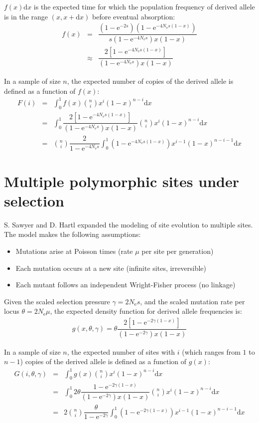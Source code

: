 \documentclass{article}
\newcommand{\e}{\mathrm{e}}
\newcommand{\der}{\mathrm{d}}
\newcommand{\Ne}{N_\mathrm{e}}
\begin{document}
$f(x) \der x $ is the expected time for which the population frequency of derived allele is in the range $(x, x+\der x)$ before eventual absorption:
\begin{eqnarray*}
	f(x) & =  & \dfrac{\left( 1 - \e^{- 2 s }\right) \left( 1 - \e^{-4 \Ne s(1-x)}\right)}{ s (1 - \e^{-4 \Ne s})x(1-x)} \\
	 & \approx  & \dfrac{2 \left[ 1 - \e^{-4 \Ne s(1-x)}\right]}{(1 - \e^{-4 \Ne s})x(1-x)}
\end{eqnarray*}

In a sample of size $n$, the expected number of copies of the derived allele is defined as a function of $f(x)$:
\begin{eqnarray*}
	F(i) & = & \int_{0}^{1} f(x) \binom{n}{i} x^{i} (1-x)^{n-i} \der x \\
	 & = & \int_{0}^{1} \dfrac{2 \left[ 1 - \e^{-4 \Ne s(1-x)}\right]}{(1 - \e^{-4 \Ne s})x(1-x)} \binom{n}{i} x^{i} (1-x)^{n-i} \der x \\
	 & = & \binom{n}{i} \dfrac{ 2 }{1 - \e^{-4 \Ne s}} \int_{0}^{1} \left( 1 - \e^{-4 \Ne s(1-x)} \right) x^{i-1} (1-x)^{n-i-1} \der x 
\end{eqnarray*}


\section*{Multiple polymorphic sites under selection}
S. Sawyer and D. Hartl expanded the modeling of site evolution to multiple sites. The model makes the following assumptions: 
\begin{itemize}
	\setlength\itemsep{-0.2em}
	\item Mutations arise at Poisson times (rate $\mu$ per site per generation)
	\item Each mutation occurs at a new site (infinite sites, irreversible)
	\item Each mutant follows an independent Wright-Fisher process (no linkage)
\end{itemize}

Given the scaled selection pressure $\gamma=2 \Ne s$, and the scaled mutation rate per locus $\theta = 2 \Ne \mu $, the expected density function for derived allele frequencies is:
\begin{eqnarray*}
g(x, \theta, \gamma) = \theta \dfrac{2 \left[ 1 - \e^{-2 \gamma(1-x)}\right]}{(1 - \e^{-2 \gamma})x(1-x)}
\end{eqnarray*}

In a sample of size $n$, the expected number of sites with $i$ (which ranges from $1$ to $n-1$) copies of the derived allele is defined as a function of $g(x)$:
\begin{eqnarray*}
	G(i, \theta, \gamma) & = & \int_{0}^{1} g(x) \binom{n}{i} x^{i} (1-x)^{n-i} \der x \\
	 & = & \int_{0}^{1} 2 \theta \dfrac{1 - \e^{-2\gamma(1-x)}}{(1 - \e^{-2\gamma})x(1-x)} \binom{n}{i} x^{i} (1-x)^{n-i} \der x \\
 & = & 2 \binom{n}{i} \dfrac{\theta }{1 - \e^{-2\gamma}} \int_{0}^{1} \left( 1 - \e^{-2\gamma(1-x)} \right) x^{i-1} (1-x)^{n-i-1} \der x 
\end{eqnarray*}
\end{document}
